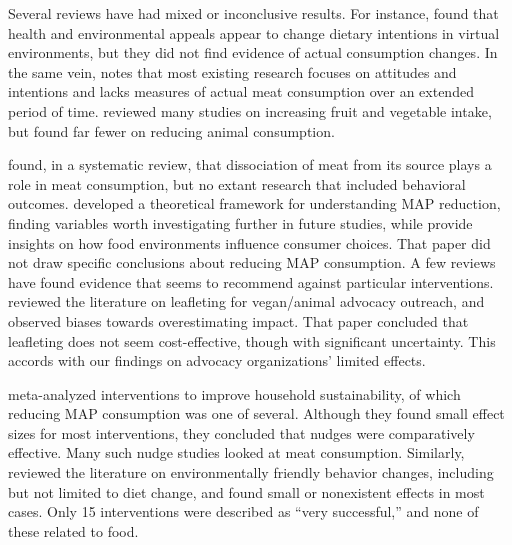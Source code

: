 \documentclass[sn-nature,referee,pdflatex]{sn-jnl}
\begin{document}
Several reviews have had mixed or inconclusive results. For instance,
\citep{bianchi2018conscious} found that health and environmental appeals
appear to change dietary intentions in virtual environments, but they
did not find evidence of actual consumption changes. In the same vein,
\citep{kwasny2022} notes that most existing research focuses on
attitudes and intentions and lacks measures of actual meat consumption
over an extended period of time. \citep{taufik2019} reviewed many
studies on increasing fruit and vegetable intake, but found far fewer on
reducing animal consumption.

\citep{benningstad2020} found, in a systematic review, that dissociation
of meat from its source plays a role in meat consumption, but no extant
research that included behavioral outcomes. \citep{graca2019} developed
a theoretical framework for understanding MAP reduction, finding
variables worth investigating further in future studies, while
\citep{pitt2017} provide insights on how food environments influence
consumer choices. That paper did not draw specific conclusions about
reducing MAP consumption. A few reviews have found evidence that seems
to recommend against particular interventions. \citep{greig2017}
reviewed the literature on leafleting for vegan/animal advocacy
outreach, and observed biases towards overestimating impact. That paper
concluded that leafleting does not seem cost-effective, though with
significant uncertainty. This accords with our findings on advocacy
organizations' limited effects.

\citep{nisa2019} meta-analyzed interventions to improve household
sustainability, of which reducing MAP consumption was one of several.
Although they found small effect sizes for most interventions, they
concluded that nudges were comparatively effective. Many such nudge
studies looked at meat consumption. Similarly, \citep{rau2022} reviewed
the literature on environmentally friendly behavior changes, including
but not limited to diet change, and found small or nonexistent effects
in most cases. Only 15 interventions were described as ``very
successful,'' and none of these related to food.

\begin{comment}
Some discussion about what's meaningful? mention that ease of implementation matters in terms of what’s meaningful. The costs of fully exposing one person is the relevant denominator. The costs of recruitment are part of the cost. Maybe some people are more amenable to nudges after hearing an argument for
\end{comment}

\newpage

\renewcommand\refname{References}

\end{document}
